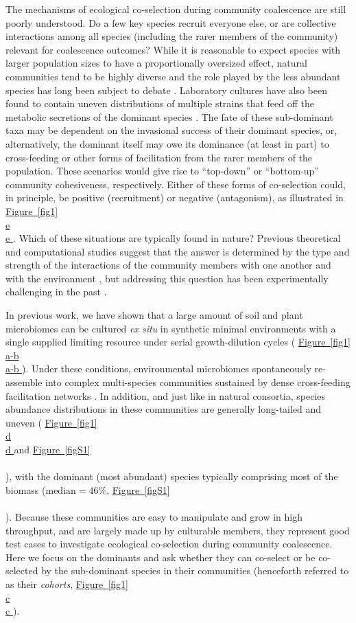 \documentclass[a4paper,10pt]{article}
\newcommand{\figref}[2][]{%
  \hyperref[{#2}]{%
    Figure~\ref*{#2}%
    \ifx\\#1\\%
    \else
      #1%
    \fi
  }%
}
\begin{document}
The mechanisms of ecological co-selection during community coalescence are still poorly understood.
Do a few key species recruit everyone else, or are collective interactions among all species
(including the rarer members of the community) relevant for coalescence outcomes?
While it is reasonable to expect species with larger population sizes to have a proportionally oversized effect,
natural communities tend to be highly diverse \cite{Louca2016}
and
the role played by the less abundant species has long been subject to debate \cite{Winfree2015}.
Laboratory cultures have also been found to contain uneven distributions of multiple strains that feed
off the metabolic secretions of the dominant species \cite{Rosenzweig1994,Goldford2018}.
The fate of these sub-dominant taxa may be dependent on the invasional success of their dominant
species, or, alternatively, the dominant itself may owe its dominance (at least in part) to cross-feeding
or other forms of facilitation from the rarer members of the population.
These scenarios would give rise to ``top-down'' or ``bottom-up'' community cohesiveness, respectively.
Either of these forms of co-selection could, in principle, be positive (recruitment) or negative (antagonism),
as illustrated in \figref[e]{fig1}.
Which of these situations are typically found in nature?
Previous theoretical and computational studies suggest that the answer is determined by the type and
strength of the interactions of the community members with one another and with the environment
\cite{Tikhonov2016,Vila2019,Lechon2021},
but addressing this question has been experimentally challenging in the past \cite{Rillig2017,Sierocinski2017}.

In previous work, we have shown that a large amount of soil and plant microbiomes can be cultured
\textit{ex situ} in synthetic minimal environments with a single supplied limiting resource under serial
growth-dilution cycles \cite{Goldford2018} (\figref[a-b]{fig1}). Under these conditions, environmental
microbiomes spontaneously re-assemble into complex multi-species communities sustained by dense
cross-feeding facilitation networks \cite{Goldford2018}. In addition,
and just like in natural consortia,
species abundance distributions
in these communities are generally long-tailed and uneven (\figref[d]{fig1} and \figref{figS1}),
with the dominant (most abundant) species typically comprising most of the biomass ($\text{median}=46\%$,
\figref{figS1}). Because these communities are easy to manipulate and grow in high throughput, and
are largely made up by culturable members, they represent good test cases to investigate ecological
co-selection during community coalescence. Here we focus on the dominants and ask whether they can
co-select or be co-selected by the sub-dominant species in their communities (henceforth referred to as
their \textit{cohorts}, \figref[c]{fig1}).
\end{document}
